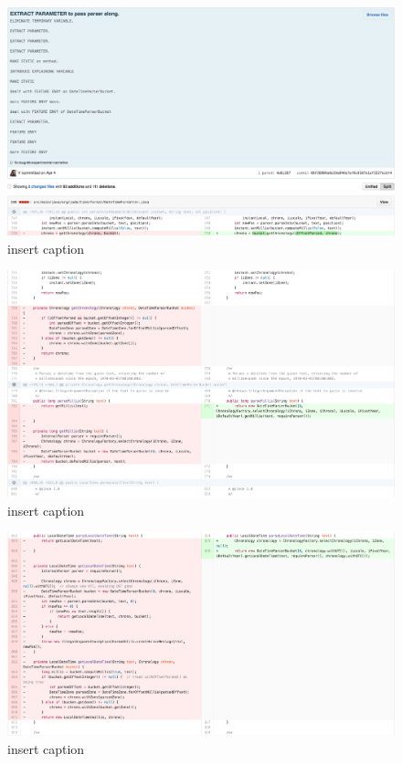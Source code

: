\begin{figure}[H]
	\centering
	\includegraphics[width=\linewidth]{code45}
	\caption{insert caption}
\end{figure}
\begin{figure}[H]
	\centering
	\includegraphics[width=\linewidth]{code46}
	\caption{insert caption}
\end{figure}
\begin{figure}[H]
	\centering
	\includegraphics[width=\linewidth]{code47}
	\caption{insert caption}
\end{figure}
